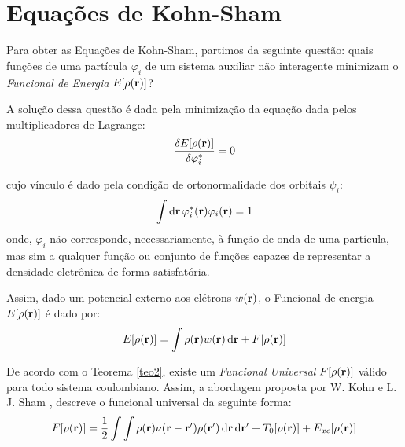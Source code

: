 \section{Equações de Kohn-Sham\label{kohn}}


Para obter as Equações de Kohn-Sham, partimos da seguinte questão: quais funções de uma partícula $ \varphi_i $ de um sistema auxiliar não interagente minimizam o \textit{Funcional de Energia} $ E\bqty{\dens} $?

A solução dessa questão é dada pela minimização da equação dada pelos multiplicadores de Lagrange:
\begin{equation}
	\fdv{E\bqty{\dens}}{\varphi_i^{\ast}}=0
\end{equation}

cujo vínculo é dado pela condição de ortonormalidade dos orbitais $ \psi_i $:
\begin{equation}\label{eq:cons}
	\int \dd{\vb{r}}\varphi_i^{\ast}(\vb{r})\varphi_i(\vb{r})=1
\end{equation} 
onde, $ \varphi_i $ não corresponde, necessariamente, à função de onda de uma partícula, mas sim a qualquer função ou conjunto de funções capazes de representar a densidade eletrônica de forma satisfatória.


Assim, dado um potencial externo aos elétrons $ w(\vb{r}) $, o Funcional de energia $ E\bqty{\dens} $ é dado por:
\begin{equation}\label{eq:Total}
	E[\rho(\vb{r})]=\int\rho(\vb{r}) w(\vb{r})\dd{\vb{r}} + F[\rho(\vb{r})]
\end{equation}

De acordo com o Teorema \ref{teo2}, existe um \textit{Funcional Universal} $ F\bqty{\dens} $ válido para todo sistema coulombiano. Assim, a abordagem proposta por W. Kohn e L. J. Sham \cite{kohn_sham}, descreve o funcional universal da seguinte forma: 
\begin{equation}\label{eq:funcional_KS}
	F\bqty{\dens}=\frac{1}{2}\int \int \dens\nu({\vb{r}-\vb{r'}})\denslinha \dr \drlinha +T_0\bqty{\dens}+E_{xc}\bqty{\dens}
\end{equation}

